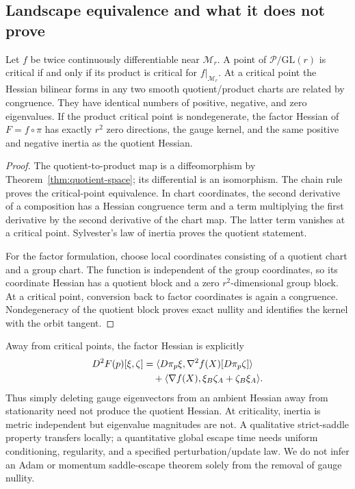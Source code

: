 \subsection{Landscape equivalence and what it does not prove}
\begin{theorem}
\label{thm:landscape}
Let $f$ be twice continuously differentiable near $\mathcal M_r$.
A point of $\mathcal P/\mathrm{GL}(r)$ is critical if and only if its
product is critical for $f|_{\mathcal M_r}$. At a critical point the
Hessian bilinear forms in any two smooth quotient/product charts are
related by congruence. They have identical numbers of positive, negative,
and zero eigenvalues. If the product critical point is nondegenerate,
the factor Hessian of $F=f\circ\pi$ has exactly $r^2$ zero directions,
the gauge kernel, and the same positive and negative inertia as the
quotient Hessian.
\end{theorem}
\begin{proof}
The quotient-to-product map is a diffeomorphism by
Theorem~\ref{thm:quotient-space}; its differential is an isomorphism.
The chain rule proves the critical-point equivalence. In chart coordinates,
the second derivative of a composition has a Hessian congruence term and
a term multiplying the first derivative by the second derivative of the
chart map. The latter term vanishes at a critical point. Sylvester's law
of inertia proves the quotient statement.

For the factor formulation, choose local coordinates consisting of a
quotient chart and a group chart. The function is independent of the group
coordinates, so its coordinate Hessian has a quotient block and a zero
$r^2$-dimensional group block. At a critical point, conversion back to
factor coordinates is again a congruence. Nondegeneracy of the quotient
block proves exact nullity and identifies the kernel with the orbit tangent.
\end{proof}

Away from critical points, the factor Hessian is explicitly
\begin{align}
 D^2F(p)[\xi,\zeta]
 &=\langle D\pi_p\xi,\nabla^2f(X)[D\pi_p\zeta]\rangle\notag\\
 &\quad+\langle\nabla f(X),\xi_B\zeta_A+\zeta_B\xi_A\rangle.
 \label{eq:factor-hessian-exact}
\end{align}
Thus simply deleting gauge eigenvectors from an ambient Hessian away from
stationarity need not produce the quotient Hessian. At criticality,
inertia is metric independent but eigenvalue magnitudes are not. A
qualitative strict-saddle property transfers locally; a quantitative global
escape time needs uniform conditioning, regularity, and a specified
perturbation/update law. We do not infer an Adam or momentum saddle-escape
theorem solely from the removal of gauge nullity.

